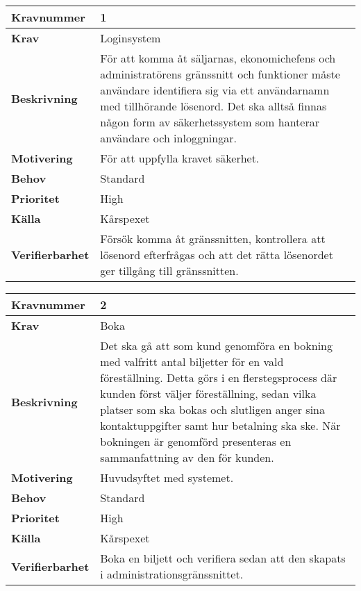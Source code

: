 \documentclass[a4paper, twoside, 11pt, titlepage]{article}
\begin{document}
\begin{tabular} { | p{3cm} | p{12.2cm} | }
	\hline
	\textbf{Kravnummer} & 1  \\
	\hline
	\textbf{Krav} & Loginsystem  \\
	\hline
	\textbf{Beskrivning} & För att komma åt säljarnas, ekonomichefens och administratörens gränssnitt och funktioner måste användare identifiera sig via ett användarnamn med tillhörande lösenord. Det ska alltså finnas någon form av säkerhetssystem som hanterar användare och inloggningar.  \\
	\hline
	\textbf{Motivering} & För att uppfylla kravet säkerhet.  \\
	\hline
	\textbf{Behov} & Standard  \\
	\hline
	\textbf{Prioritet} & High  \\
	\hline
	\textbf{Källa} & Kårspexet  \\
	\hline
	\textbf{Verifierbarhet} & Försök komma åt gränssnitten, kontrollera att lösenord efterfrågas och att det rätta lösenordet ger tillgång till gränssnitten.  \\
	\hline
\end{tabular}

\begin{tabular} { | p{3cm} | p{12.2cm} | }
	\hline
	\textbf{Kravnummer} & 2  \\
	\hline
	\textbf{Krav} & Boka  \\
	\hline
	\textbf{Beskrivning} & Det ska gå att som kund genomföra en bokning med valfritt antal biljetter för en vald föreställning. Detta görs i en flerstegsprocess där kunden först väljer föreställning, sedan vilka platser som ska bokas och slutligen anger sina kontaktuppgifter samt hur betalning ska ske. När bokningen är genomförd presenteras en sammanfattning av den för kunden.  \\
	\hline
	\textbf{Motivering} & Huvudsyftet med systemet.  \\
	\hline
	\textbf{Behov} & Standard  \\
	\hline
	\textbf{Prioritet} & High  \\
	\hline
	\textbf{Källa} & Kårspexet  \\
	\hline
	\textbf{Verifierbarhet} & Boka en biljett och verifiera sedan att den skapats i administrationsgränssnittet.  \\
	\hline
\end{tabular}
\end{document}
